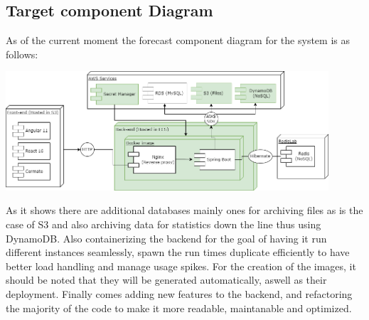 \subsection {Target component Diagram}
As of the current moment the forecast component diagram for the system is as follows:

\begin{center}
    \includegraphics[width=0.9\textwidth]{images/forecast}
\end{center}

As it shows there are additional databases mainly ones for archiving files as is the case of
S3 and also archiving data for statistics down the line thus using DynamoDB\@.
Also containerizing the backend for the goal of having it run different instances
seamlessly, spawn the run times duplicate efficiently to have better load handling
and manage usage spikes.
For the creation of the images, it should be noted that they will be generated
automatically, aswell as their deployment.
Finally comes adding new features to the backend, and refactoring the majority of the code
to make it more readable, maintanable and optimized.

